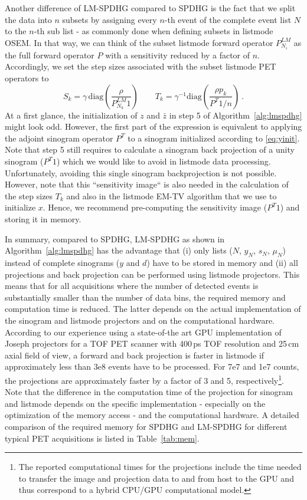 Another difference of LM-SPDHG compared to SPDHG is the fact that we split the data into $n$ subsets by
assigning every $n$-th event of the complete event list $N$ to the $n$-th sub list - 
as commonly done when defining subsets in listmode OSEM.
In that way, we can think of the subset listmode forward operator $P^{LM}_{N_i}$
as the full forward operator $P$ with a sensitivity reduced by a factor of $n$.
Accordingly, we set the step sizes associated with the subset listmode PET operators to
%
\begin{equation}
S_k = \gamma \, \text{diag}(\frac{\rho}{P^{LM}_{N_k} 1} )\qquad  T_k = \gamma^{-1} \text{diag}(\frac{\rho p_k}{P^T 1/n}) \ . 
\label{eq:lm_stepsizes}
\end{equation}
% 
At a first glance, the initialization of $z$ and $\bar{z}$ in step 5 of Algorithm~\ref{alg:lmspdhg} 
might look odd.
However, the first part of the expression is equivalent to 
applying the adjoint sinogram operator $P^T$ to a sinogram initialized according to \eqref{eq:yinit}.
Note that step 5 still requires to calculate a sinogram back projection of a unity sinogram ($P^T 1$)
which we would like to avoid in listmode data processing.
Unfortunately, avoiding this single sinogram backprojection is not possible.
However, note that this ``sensitivity image`` is also needed in the calculation of the step sizes
$T_k$ and also in the listmode EM-TV algorithm that we use to initialize $x$.
Hence, we recommend pre-computing the sensitivity image ($P^T 1$) and storing it in memory.

In summary, compared to SPDHG, LM-SPDHG as shown in Algorithm~\ref{alg:lmspdhg} has the advantage
that (i) only lists ($N$, $y_{N}$, $s_N$, $\mu_N$) instead of complete sinograms 
($y$ and $d$) have to be 
stored in memory and (ii) all projections and back projection can be performed using listmode
projectors.
This means that for all acquisitions where the number of detected events is substantially smaller than
the number of data bins, the required memory and computation time is reduced.
The latter depends on the actual implementation of the sinogram and listmode projectors
and on the computational hardware.
According to our experience using a state-of-the art GPU implementation of Joseph projectors 
\cite{Joseph1982} for a TOF PET scanner with 400\,ps TOF resolution and 25\,cm axial field of view,
a forward and back projection is faster in listmode if approximately less than 3e8 events 
have to be processed.
For 7e7 and 1e7 counts, the projections are approximately faster by a factor of 3 and 5,
respectively\footnote{The reported computational times for the projections include the time
needed to transfer the image and projection data to and from host to the GPU and thus
correspond to a hybrid CPU/GPU computational model.}.
Note that the difference in the computation time of the projection for sinogram and listmode 
depends on the specific implementation - especially on the optimization of the memory access - 
and the computational hardware.
A detailed comparison of the required memory for SPDHG and LM-SPDHG for different typical PET
acquisitions is listed in Table~\ref{tab:mem}.

